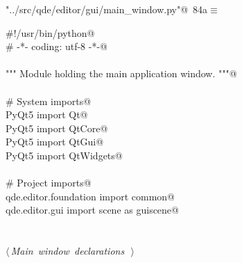 \documentclass[
    a4paper,      %
    10pt,         %
    openright,    %
    notitlepage,  %
    parskip=half, %
]{scrreprt}       %
\theoremstyle{definition}                    %
\begin{document}
\begin{flushleft} \small
\begin{minipage}{\linewidth}\label{scrap135}\raggedright\small
{} \verb@"../src/qde/editor/gui/main_window.py"@\nobreak\ {\footnotesize {84a}}$\equiv$
\vspace{-1ex}
\begin{list}{}{} \item
\mbox{}\lstinline@#!/usr/bin/python@\\
\mbox{}\lstinline@# -*- coding: utf-8 -*-@\\
\mbox{}\lstinline@@\\
\mbox{}\lstinline@""" Module holding the main application window. """@\\
\mbox{}\lstinline@@\\
\mbox{}\lstinline@# System imports@\\
\mbox{}\lstinline@from PyQt5 import Qt@\\
\mbox{}\lstinline@from PyQt5 import QtCore@\\
\mbox{}\lstinline@from PyQt5 import QtGui@\\
\mbox{}\lstinline@from PyQt5 import QtWidgets@\\
\mbox{}\lstinline@@\\
\mbox{}\lstinline@# Project imports@\\
\mbox{}\lstinline@from qde.editor.foundation import common@\\
\mbox{}\lstinline@from qde.editor.gui import scene as guiscene@\\
\mbox{}\lstinline@@\\
\mbox{}\lstinline@@\\
\mbox{}\lstinline@@\hbox{$\langle\,${\itshape Main window declarations}\nobreak\ {\footnotesize {}}$\,\rangle$}\lstinline@@\\
\mbox{}\lstinline@@{\NWsep}
\end{list}
\vspace{-1.5ex}
\footnotesize
\begin{list}{}{\setlength{\itemsep}{-\parsep}\setlength{\itemindent}{-\leftmargin}}

\item{}
\end{list}
\end{minipage}\vspace{4ex}
\end{flushleft}
\end{document}
